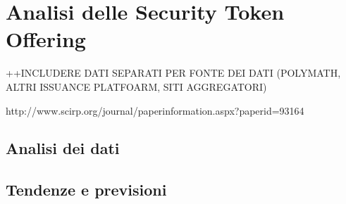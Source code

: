 \chapter{Analisi delle Security Token Offering}
++INCLUDERE DATI SEPARATI PER FONTE DEI DATI (POLYMATH, ALTRI ISSUANCE PLATFOARM, SITI AGGREGATORI)


http://www.scirp.org/journal/paperinformation.aspx?paperid=93164


\section{Analisi dei dati}

\section{Tendenze e previsioni}